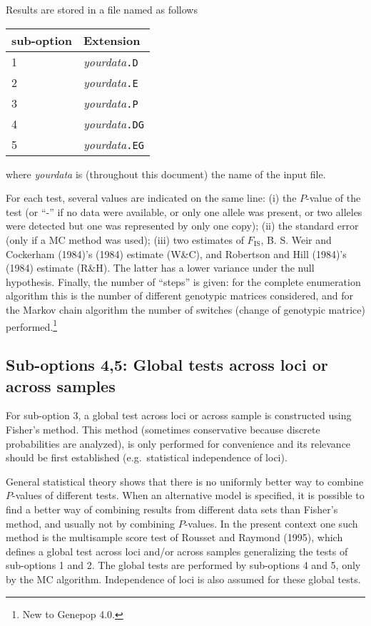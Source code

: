 \documentclass[
  12pt,
]{book}
\begin{document}
Results are stored in a file named as follows

\begin{longtable}[]{@{}ll@{}}
\toprule()
sub-option & Extension \\
\midrule()
\endhead
1 & \emph{yourdata}\texttt{.D} \\
2 & \emph{yourdata}\texttt{.E} \\
3 & \emph{yourdata}\texttt{.P} \\
4 & \emph{yourdata}\texttt{.DG} \\
5 & \emph{yourdata}\texttt{.EG} \\
\bottomrule()
\end{longtable}

where \emph{yourdata} is (throughout this document) the name of the input file.

For each test, several values are indicated on the same line: (i) the \(P\)-value of the test (or ``-'' if no data were available, or only one allele was present, or two alleles were detected but one was represented by only one copy); (ii) the standard error (only if a MC method was used); (iii) two estimates of \(F_\mathrm{IS}\), B. S. Weir and Cockerham (1984)'s (1984) estimate (W\&C), and Robertson and Hill (1984)'s (1984) estimate (R\&H). The latter has a lower variance under the null hypothesis. Finally, the number of ``steps'' is given: for the complete enumeration algorithm this is the number of different genotypic matrices considered, and for the Markov chain algorithm the number of switches (change of genotypic matrice) performed.\footnote{New to Genepop 4.0.}

\hypertarget{sub-options-45-global-tests-across-loci-or-across-samples}{%
\subsection{Sub-options 4,5: Global tests across loci or across samples}\label{sub-options-45-global-tests-across-loci-or-across-samples}}

For sub-option 3, a global test across loci or across sample is constructed using Fisher's method. This method (sometimes conservative because discrete probabilities are analyzed), is only performed for convenience and its relevance should be first established (e.g.~statistical independence of loci).

General statistical theory shows that there is no uniformly better way to combine \(P\)-values of different tests. When an alternative model is specified, it is possible to find a better way of combining results from different data sets than Fisher's method, and usually not by combining \(P\)-values. In the present context one such method is the multisample score test of Rousset and Raymond (1995), which defines a global test across loci and/or across samples generalizing the tests of sub-options 1 and 2. The global tests are performed by sub-options 4 and 5, only by the MC algorithm. Independence of loci is also assumed for these global tests.
\end{document}
